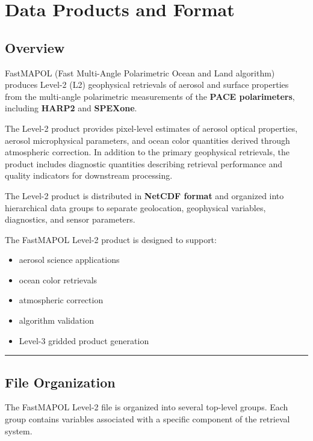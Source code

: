 \documentclass[
  letterpaper,
  open=any]{scrbook}
\providecommand{\tightlist}{%
  \setlength{\itemsep}{0pt}\setlength{\parskip}{0pt}}
\begin{document}

\chapter{Data Products and Format}\label{data-products-and-format}

\section{Overview}\label{overview}

FastMAPOL (Fast Multi-Angle Polarimetric Ocean and Land algorithm)
produces Level-2 (L2) geophysical retrievals of aerosol and surface
properties from the multi-angle polarimetric measurements of the
\textbf{PACE polarimeters}, including \textbf{HARP2} and
\textbf{SPEXone}.

The Level-2 product provides pixel-level estimates of aerosol optical
properties, aerosol microphysical parameters, and ocean color quantities
derived through atmospheric correction. In addition to the primary
geophysical retrievals, the product includes diagnostic quantities
describing retrieval performance and quality indicators for downstream
processing.

The Level-2 product is distributed in \textbf{NetCDF format} and
organized into hierarchical data groups to separate geolocation,
geophysical variables, diagnostics, and sensor parameters.

The FastMAPOL Level-2 product is designed to support:

\begin{itemize}
\tightlist
\item
  aerosol science applications
\item
  ocean color retrievals
\item
  atmospheric correction
\item
  algorithm validation
\item
  Level-3 gridded product generation
\end{itemize}

\begin{center}\rule{0.5\linewidth}{0.5pt}\end{center}

\section{File Organization}\label{file-organization}

The FastMAPOL Level-2 file is organized into several top-level groups.
Each group contains variables associated with a specific component of
the retrieval system.
\end{document}
